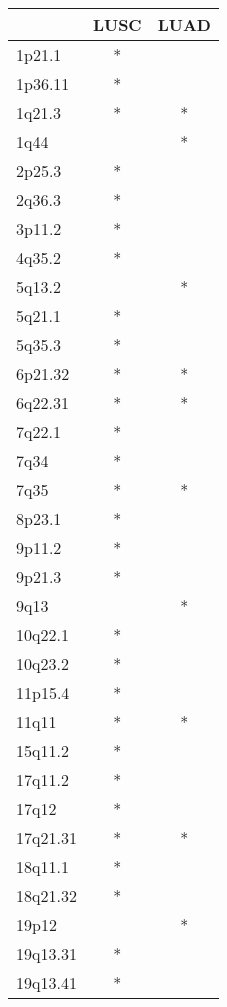 \begin{tabular}{lcc}
\toprule
{} & LUSC & LUAD \\
\midrule
1p21.1   &    * &      \\
1p36.11  &    * &      \\
1q21.3   &    * &    * \\
1q44     &      &    * \\
2p25.3   &    * &      \\
2q36.3   &    * &      \\
3p11.2   &    * &      \\
4q35.2   &    * &      \\
5q13.2   &      &    * \\
5q21.1   &    * &      \\
5q35.3   &    * &      \\
6p21.32  &    * &    * \\
6q22.31  &    * &    * \\
7q22.1   &    * &      \\
7q34     &    * &      \\
7q35     &    * &    * \\
8p23.1   &    * &      \\
9p11.2   &    * &      \\
9p21.3   &    * &      \\
9q13     &      &    * \\
10q22.1  &    * &      \\
10q23.2  &    * &      \\
11p15.4  &    * &      \\
11q11    &    * &    * \\
15q11.2  &    * &      \\
17q11.2  &    * &      \\
17q12    &    * &      \\
17q21.31 &    * &    * \\
18q11.1  &    * &      \\
18q21.32 &    * &      \\
19p12    &      &    * \\
19q13.31 &    * &      \\
19q13.41 &    * &      \\
\bottomrule
\end{tabular}
